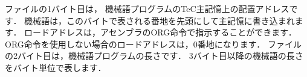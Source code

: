 ファイルの1バイト目は，
機械語プログラムのTeC主記憶上の配置アドレスです．
機械語は，このバイトで表される番地を先頭にして主記憶に書き込まれます．
ロードアドレスは，アセンブラのORG命令で指示することができます．
ORG命令を使用しない場合のロードアドレスは，0番地になります．
ファイルの2バイト目は，機械語プログラムの長さです．
3バイト目以降の機械語の長さをバイト単位で表します．


